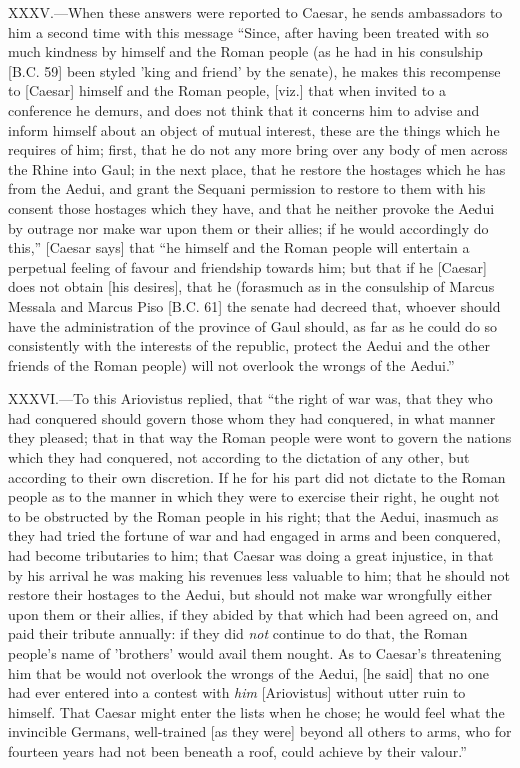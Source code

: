 XXXV.—When these answers were reported to Caesar, he sends ambassadors
to him a second time with this message ``Since, after having been treated
with so much kindness by himself and the Roman people (as he had in his
consulship [B.C. 59] been styled 'king and friend' by the senate), he
makes this recompense to [Caesar] himself and the Roman people, [viz.]
that when invited to a conference he demurs, and does not think that it
concerns him to advise and inform himself about an object of mutual
interest, these are the things which he requires of him; first, that he
do not any more bring over any body of men across the Rhine into Gaul;
in the next place, that he restore the hostages which he has from the
Aedui, and grant the Sequani permission to restore to them with his
consent those hostages which they have, and that he neither provoke the
Aedui by outrage nor make war upon them or their allies; if he would
accordingly do this,'' [Caesar says] that ``he himself and the Roman
people will entertain a perpetual feeling of favour and friendship
towards him; but that if he [Caesar] does not obtain [his desires], that
he (forasmuch as in the consulship of Marcus Messala and Marcus Piso
[B.C. 61] the senate had decreed that, whoever should have the
administration of the province of Gaul should, as far as he could do so
consistently with the interests of the republic, protect the Aedui and
the other friends of the Roman people) will not overlook the wrongs of
the Aedui.''

XXXVI.—To this Ariovistus replied, that ``the right of war was, that
they who had conquered should govern those whom they had conquered, in
what manner they pleased; that in that way the Roman people were wont to
govern the nations which they had conquered, not according to the
dictation of any other, but according to their own discretion. If he for
his part did not dictate to the Roman people as to the manner in which
they were to exercise their right, he ought not to be obstructed by the
Roman people in his right; that the Aedui, inasmuch as they had tried
the fortune of war and had engaged in arms and been conquered, had
become tributaries to him; that Caesar was doing a great injustice, in
that by his arrival he was making his revenues less valuable to him;
that he should not restore their hostages to the Aedui, but should not
make war wrongfully either upon them or their allies, if they abided by
that which had been agreed on, and paid their tribute annually: if they
did \emph{not} continue to do that, the Roman people's name of 'brothers'
would avail them nought. As to Caesar's threatening him that be would
not overlook the wrongs of the Aedui, [he said] that no one had ever
entered into a contest with \emph{him} [Ariovistus] without utter ruin to
himself. That Caesar might enter the lists when he chose; he would feel
what the invincible Germans, well-trained [as they were] beyond all
others to arms, who for fourteen years had not been beneath a roof,
could achieve by their valour.''

